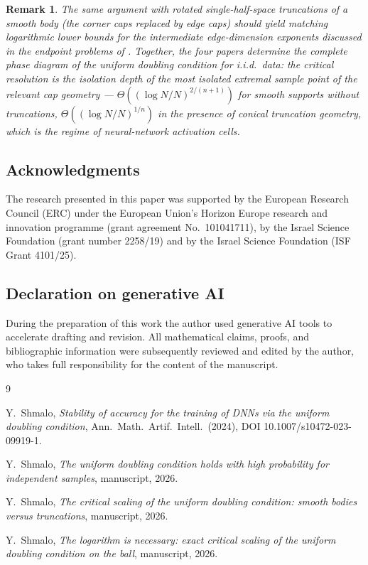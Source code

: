 \documentclass[11pt]{article}
\newtheorem{remark}[theorem]{Remark}
\begin{document}
\begin{remark}
The same argument with rotated single-half-space truncations of a smooth body
(the corner caps replaced by edge caps) should yield matching logarithmic
lower bounds for the intermediate edge-dimension exponents discussed in the
endpoint problems of \cite{companion3}.  Together, the four papers determine the complete phase diagram of the
uniform doubling condition for i.i.d.\ data: the critical resolution is the
isolation depth of the most isolated extremal sample point of the relevant
cap geometry --- $\Theta((\log N/N)^{2/(n+1)})$ for smooth supports without
truncations, $\Theta((\log N/N)^{1/n})$ in the presence of conical truncation
geometry, which is the regime of neural-network activation cells.
\end{remark}

\subsection*{Acknowledgments}
The research presented in this paper was supported by the European Research
Council (ERC) under the European Union's Horizon Europe research and
innovation programme (grant agreement No.\ 101041711), by the Israel Science
Foundation (grant number 2258/19) and by the Israel Science Foundation (ISF
Grant 4101/25).

\subsection*{Declaration on generative AI}
During the preparation of this work the author used generative AI tools to
accelerate drafting and revision.  All mathematical claims, proofs, and
bibliographic information were subsequently reviewed and edited by the author,
who takes full responsibility for the content of the manuscript.

\begin{thebibliography}{9}

Y.~Shmalo,
\emph{Stability of accuracy for the training of DNNs via the uniform doubling
condition},
Ann.\ Math.\ Artif.\ Intell.\ (2024), DOI 10.1007/s10472-023-09919-1.

Y.~Shmalo,
\emph{The uniform doubling condition holds with high probability for
independent samples}, manuscript, 2026.

Y.~Shmalo,
\emph{The critical scaling of the uniform doubling condition: smooth bodies
versus truncations}, manuscript, 2026.

Y.~Shmalo,
\emph{The logarithm is necessary: exact critical scaling of the uniform
doubling condition on the ball}, manuscript, 2026.

\end{thebibliography}
\end{document}
